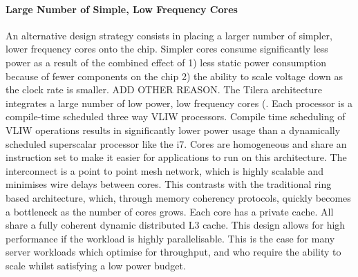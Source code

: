 \paragraph{Large Number of Simple, Low Frequency Cores} An alternative
design strategy consists in placing a larger number of simpler, lower frequency cores
onto the chip. Simpler cores consume significantly less power as
a result of the combined effect of 1) less static power consumption because 
of fewer components on the chip 2) the ability to scale voltage down as
the clock rate is smaller. ADD OTHER REASON. The Tilera
architecture integrates a large number of low power, low frequency 
cores (. Each processor is a compile-time scheduled three way VLIW processors.
Compile time scheduling of VLIW operations results in significantly
lower power usage than a dynamically scheduled superscalar
processor like the i7. Cores are homogeneous and share 
an instruction set to make it easier for applications to run on
this architecture.  The interconnect is a point to point mesh network, which
is highly scalable and minimises wire delays between cores. This
contrasts with the traditional ring based architecture, which,
through memory coherency protocols, quickly becomes a bottleneck
as the number of cores grows. Each
core has a private cache. All share a fully coherent dynamic
distributed L3 cache.  This design allows for high performance
if the workload is highly parallelisable. This is the case for many 
server workloads which optimise for throughput, and who require
the ability to scale whilst satisfying a low power budget.  

